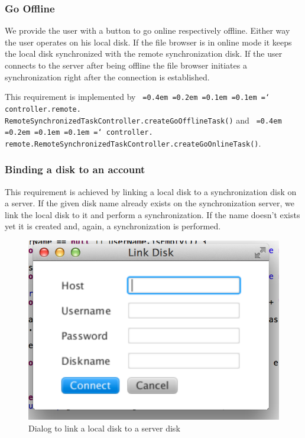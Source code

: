\documentclass[a4paper,12pt]{article}
\newcommand*\justify{%
  \fontdimen2\font=0.4em%
  \fontdimen3\font=0.2em%
  \fontdimen4\font=0.1em%
  \fontdimen7\font=0.1em%
  \hyphenchar\font=`\-%
}
\newcommand{\mono}[1]{\texttt{\justify #1}}
\begin{document}
\subsubsection{Go Offline}
We provide the user with a button to go online respectively offline. Either way the user operates on his local disk. If the file browser is in online mode it keeps the local disk synchronized with the remote synchronization disk. If the user connects to the server after being offline the file browser initiates a synchronization right after the connection is established.

This requirement is implemented by \mono{controller.remote.\\ RemoteSynchronizedTaskController.createGoOfflineTask()} and \mono{controller.\\ remote.RemoteSynchronizedTaskController.createGoOnlineTask()}.

\subsubsection{Binding a disk to an account}
This requirement is achieved by linking a local disk to a synchronization disk on a server. If the given disk name already exists on the synchronization server, we link the local disk to it and perform a synchronization. If the name doesn't exists yet it is created and, again, a synchronization is performed.

\begin{figure}[H]\centering
    \includegraphics[scale=0.7]{link.png}
    \caption{Dialog to link a local disk to a server disk}
\end{figure}
\end{document}
